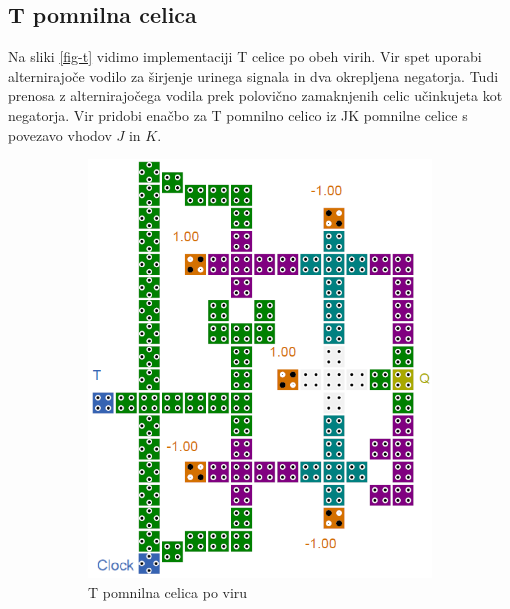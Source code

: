 \documentclass[a4paper, 11pt]{article}
\begin{document}
\subsection{T pomnilna celica}
Na sliki \ref{fig-t} vidimo implementaciji T celice po obeh virih. Vir \cite{quantum_dot} spet uporabi alternirajoče vodilo za širjenje urinega signala in dva okrepljena negatorja. Tudi prenosa z alternirajočega vodila prek polovično zamaknjenih celic učinkujeta kot negatorja. Vir \cite{a_novel_approach} pridobi enačbo za T pomnilno celico iz JK pomnilne celice s povezavo vhodov $J$ in $K$.
\begin{figure}[h!]
	\begin{subfigure}[b]{0.5\textwidth}
	\includegraphics[width=\textwidth]{../img/vir_4/t.png}
	\caption{T pomnilna celica po viru \cite{quantum_dot}}
	\label{fig-t-1}
	\end{subfigure}
	\begin{subfigure}[b]{0.5\textwidth}

\end{subfigure}
\end{figure}
\end{document}
